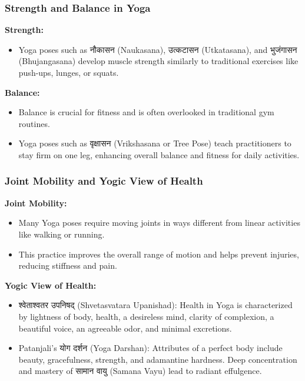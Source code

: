 \begin{frame}[fragile]\frametitle{Strength and Balance in Yoga}
    \textbf{Strength:}
    \begin{itemize}
        \item Yoga poses such as नौकासन (Naukasana), उत्कटासन (Utkatasana), and भुजंगासन (Bhujangasana) develop muscle strength similarly to traditional exercises like push-ups, lunges, or squats.
    \end{itemize}

    
    \textbf{Balance:}
    \begin{itemize}
        \item Balance is crucial for fitness and is often overlooked in traditional gym routines. 
        \item Yoga poses such as वृक्षासन (Vrikshasana or Tree Pose) teach practitioners to stay firm on one leg, enhancing overall balance and fitness for daily activities.
    \end{itemize}
\end{frame}

\begin{frame}[fragile]\frametitle{Joint Mobility and Yogic View of Health}
    \textbf{Joint Mobility:}
    \begin{itemize}
        \item Many Yoga poses require moving joints in ways different from linear activities like walking or running.
        \item This practice improves the overall range of motion and helps prevent injuries, reducing stiffness and pain.
    \end{itemize}

    
    \textbf{Yogic View of Health:}
    \begin{itemize}
        \item श्वेताश्वतर उपनिषद् (Shvetasvatara Upanishad): Health in Yoga is characterized by lightness of body, health, a desireless mind, clarity of complexion, a beautiful voice, an agreeable odor, and minimal excretions.
        \item Patanjali’s योग दर्शन (Yoga Darshan): Attributes of a perfect body include beauty, gracefulness, strength, and adamantine hardness. Deep concentration and mastery of सामान वायु (Samana Vayu) lead to radiant effulgence.
    \end{itemize}
\end{frame}


